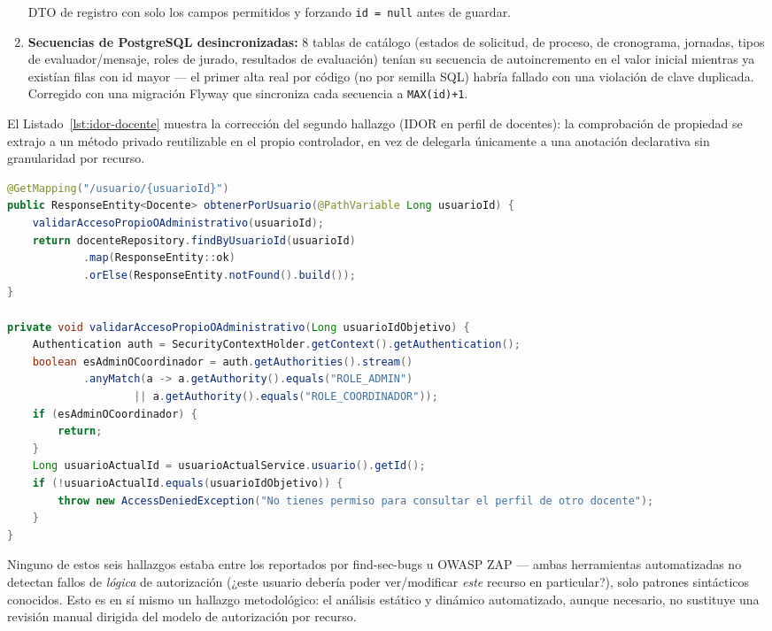 \begin{enumerate}[nosep]
    DTO de registro con solo los campos permitidos y forzando \texttt{id = null} antes de guardar.
    \item \textbf{Secuencias de PostgreSQL desincronizadas:} 8 tablas de catálogo (estados de solicitud,
    de proceso, de cronograma, jornadas, tipos de evaluador/mensaje, roles de jurado, resultados de
    evaluación) tenían su secuencia de autoincremento en el valor inicial mientras ya existían filas con
    id mayor --- el primer alta real por código (no por semilla SQL) habría fallado con una violación de
    clave duplicada. Corregido con una migración Flyway que sincroniza cada secuencia a
    \texttt{MAX(id)+1}.
\end{enumerate}

El Listado~\ref{lst:idor-docente} muestra la corrección del segundo hallazgo (IDOR en perfil de
docentes): la comprobación de propiedad se extrajo a un método privado reutilizable en el propio
controlador, en vez de delegarla únicamente a una anotación declarativa sin granularidad por recurso.

\begin{lstlisting}[language=Java,style=codigobase,caption={Correccion del IDOR de \texttt{DocenteController}: verificacion de propiedad del recurso antes de exponerlo.},label={lst:idor-docente}]
@GetMapping("/usuario/{usuarioId}")
public ResponseEntity<Docente> obtenerPorUsuario(@PathVariable Long usuarioId) {
    validarAccesoPropioOAdministrativo(usuarioId);
    return docenteRepository.findByUsuarioId(usuarioId)
            .map(ResponseEntity::ok)
            .orElse(ResponseEntity.notFound().build());
}

private void validarAccesoPropioOAdministrativo(Long usuarioIdObjetivo) {
    Authentication auth = SecurityContextHolder.getContext().getAuthentication();
    boolean esAdminOCoordinador = auth.getAuthorities().stream()
            .anyMatch(a -> a.getAuthority().equals("ROLE_ADMIN")
                    || a.getAuthority().equals("ROLE_COORDINADOR"));
    if (esAdminOCoordinador) {
        return;
    }
    Long usuarioActualId = usuarioActualService.usuario().getId();
    if (!usuarioActualId.equals(usuarioIdObjetivo)) {
        throw new AccessDeniedException("No tienes permiso para consultar el perfil de otro docente");
    }
}
\end{lstlisting}

Ninguno de estos seis hallazgos estaba entre los reportados por find-sec-bugs u OWASP ZAP --- ambas
herramientas automatizadas no detectan fallos de \emph{lógica} de autorización (¿este usuario debería
poder ver/modificar \emph{este} recurso en particular?), solo patrones sintácticos conocidos. Esto es en
sí mismo un hallazgo metodológico: el análisis estático y dinámico automatizado, aunque necesario, no
sustituye una revisión manual dirigida del modelo de autorización por recurso.

